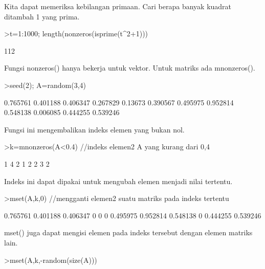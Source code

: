 \documentclass[a4paper,10pt]{article}
\begin{document}
\begin{eulernotebook}
\begin{eulercomment}
\begin{eulercomment}
\begin{eulercomment}
\begin{eulercomment}
\begin{eulercomment}
\begin{eulercomment}
\begin{eulercomment}
\begin{eulercomment}
\begin{eulercomment}
\begin{eulercomment}
\begin{eulercomment}
\begin{eulercomment}
\begin{eulercomment}
Kita dapat memeriksa kebilangan primaan. Cari berapa banyak kuadrat ditambah 1
yang prima.
\end{eulercomment}
\begin{eulerprompt}
>t=1:1000; length(nonzeros(isprime(t^2+1)))
\end{eulerprompt}
\begin{euleroutput}
  112
\end{euleroutput}
\begin{eulercomment}
Fungsi nonzeros() hanya bekerja untuk vektor. Untuk matriks ada mnonzeros().
\end{eulercomment}
\begin{eulerprompt}
>seed(2); A=random(3,4)
\end{eulerprompt}
\begin{euleroutput}
       0.765761      0.401188      0.406347      0.267829 
        0.13673      0.390567      0.495975      0.952814 
       0.548138      0.006085      0.444255      0.539246 
\end{euleroutput}
\begin{eulercomment}
Fungsi ini mengembalikan indeks elemen yang bukan nol.
\end{eulercomment}
\begin{eulerprompt}
>k=mnonzeros(A<0.4) //indeks elemen2 A yang kurang dari 0,4
\end{eulerprompt}
\begin{euleroutput}
              1             4 
              2             1 
              2             2 
              3             2 
\end{euleroutput}
\begin{eulercomment}
Indeks ini dapat dipakai untuk mengubah elemen menjadi nilai tertentu.
\end{eulercomment}
\begin{eulerprompt}
>mset(A,k,0) //mengganti elemen2 suatu matriks pada indeks tertentu
\end{eulerprompt}
\begin{euleroutput}
       0.765761      0.401188      0.406347             0 
              0             0      0.495975      0.952814 
       0.548138             0      0.444255      0.539246 
\end{euleroutput}
\begin{eulercomment}
mset() juga dapat mengisi elemen pada indeks tersebut dengan elemen matriks
lain.
\end{eulercomment}
\begin{eulerprompt}
>mset(A,k,-random(size(A)))

\end{eulerprompt}
\end{eulercomment}
\end{eulercomment}
\end{eulercomment}
\end{eulercomment}
\end{eulercomment}
\end{eulercomment}
\end{eulercomment}
\end{eulercomment}
\end{eulercomment}
\end{eulercomment}
\end{eulercomment}
\end{eulercomment}
\end{eulernotebook}
\end{document}
